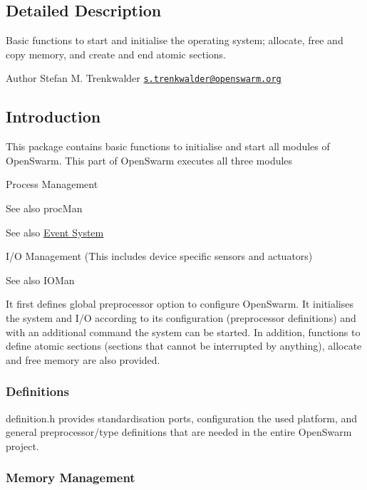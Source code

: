 \subsection{Detailed Description}
Basic functions to start and initialise the operating system; allocate, free and copy memory, and create and end atomic sections. 

\begin{DoxyAuthor}{Author}
Stefan M. Trenkwalder \href{mailto:s.trenkwalder@openswarm.org}{\tt s.\+trenkwalder@openswarm.\+org}
\end{DoxyAuthor}
\hypertarget{group__base_sec_intro_base}{}\subsection{Introduction}\label{group__base_sec_intro_base}
This package contains basic functions to initialise and start all modules of Open\+Swarm. This part of Open\+Swarm executes all three modules
\begin{DoxyEnumerate}
\item Process Management \begin{DoxySeeAlso}{See also}
proc\+Man
\end{DoxySeeAlso}

\item \begin{DoxySeeAlso}{See also}
\hyperlink{group__events}{Event System}
\end{DoxySeeAlso}

\item I/\+O Management (This includes device specific sensors and actuators) \begin{DoxySeeAlso}{See also}
I\+O\+Man
\end{DoxySeeAlso}
It first defines global preprocessor option to configure Open\+Swarm. It initialises the system and I/\+O according to its configuration (preprocessor definitions) and with an additional command the system can be started. In addition, functions to define atomic sections (sections that cannot be interrupted by anything), allocate and free memory are also provided.
\end{DoxyEnumerate}\hypertarget{group__base_ssec_intro_base_defs}{}\subsubsection{Definitions}\label{group__base_ssec_intro_base_defs}
definition.\+h provides standardisation ports, configuration the used platform, and general preprocessor/type definitions that are needed in the entire Open\+Swarm project.\hypertarget{group__base_ssec_intro_base_mem}{}\subsubsection{Memory Management}\label{group__base_ssec_intro_base_mem}
